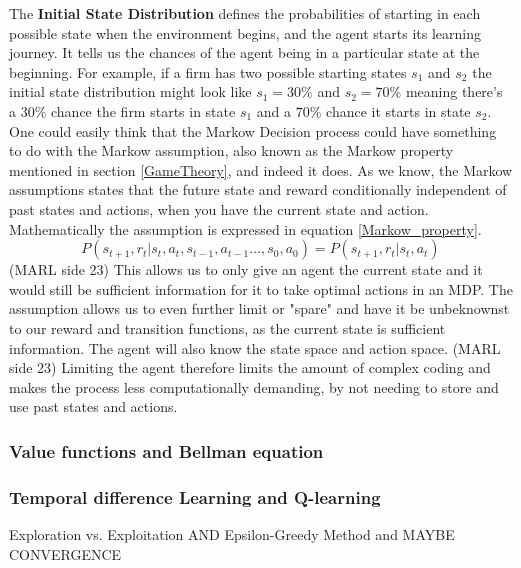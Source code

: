 \documentclass{article}
\begin{document}
The \textbf{Initial State Distribution} defines the probabilities of starting in each possible state when the environment begins, and the agent starts its learning journey. It tells us the chances of the agent being in a particular state at the beginning. For example, if a firm has two possible starting states $s_1$ and $s_2$ the initial state distribution might look like $s_1=30\%$ and $s_2 = 70\%$ meaning there's a $30\%$ chance the firm starts in state $s_1$ and a $70\%$ chance it starts in state $s_2$.
\newline 
\newline 
One could easily think that the Markow Decision process could have something to do with the Markow assumption, also known as the Markow property mentioned in section \ref{GameTheory}, and indeed it does. 
As we know, the Markow assumptions states that the future state and reward conditionally independent of past states and actions, when you have the current state and action. Mathematically the assumption is expressed in equation \ref{Markow_property}.
\begin{equation}
\label{Markow_property}
P(s_{t+1}, r_t | s_t, a_t, s_{t-1},a_{t-1} \dots, s_0, a_0) = P(s_{t+1}, r_t | s_t, a_t)
\end{equation}
(MARL side 23)
This allows us to only give an agent the current state and it would still be sufficient information for it to take optimal actions in an MDP. The assumption allows us to even further limit or "spare" and have it be unbeknownst to our reward and transition functions, as the current state is sufficient information. The agent will also know the state space and action space.  (MARL side 23)
Limiting the agent therefore limits the amount of complex coding and makes the process less computationally demanding, by not needing to store and use past states and actions.  
\subsubsection{Value functions and Bellman equation}

\subsubsection{Temporal difference Learning and Q-learning}
Exploration vs. Exploitation
AND 
Epsilon-Greedy Method and MAYBE CONVERGENCE
\end{document}
